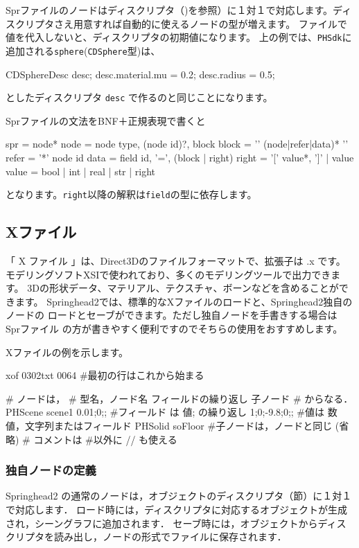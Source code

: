 Sprファイルのノードはディスクリプタ（)を参照）に１対１で対応します。ディスクリプタさえ用意すれば自動的に使えるノードの型が増えます。
\KLUDGE ファイルで値を代入しないと、ディスクリプタの初期値になります。
\KLUDGE 上の例では、\texttt{PHSdk}に追加される\texttt{sphere}(\texttt{CDSphere}型)は、
\begin{sourcecode}
CDSphereDesc desc;
desc.material.mu = 0.2;
desc.radius = 0.5;
\end{sourcecode}
\KLUDGE としたディスクリプタ \texttt{desc} で作るのと同じことになります。

Sprファイルの文法をBNF＋正規表現で書くと
\begin{sourcecode}
spr   = node*
node  = node type, (node id)?, block
block = '{' (node|refer|data)*  '}'
refer = '*' node id
data  = field id, '=', (block | right)
right = '[' value*, ']' | value
value = bool | int | real | str | right
\end{sourcecode}
\KLUDGE となります。\texttt{right}以降の解釈は\texttt{field}の型に依存します。

\subsection{Xファイル}
\KLUDGE 「 X ファイル 」は、Direct3Dのファイルフォーマットで、拡張子は .x です。
\KLUDGE モデリングソフトXSIで使われており、多くのモデリングツールで出力できます。
3Dの形状データ、マテリアル、テクスチャ、ボーンなどを含めることができます。
Springhead2では、標準的なXファイルのロードと、Springhead2独自のノードの
\KLUDGE ロードとセーブができます。ただし独自ノードを手書きする場合は Sprファイル
\KLUDGE の方が書きやすく便利ですのでそちらの使用をおすすめします。

Xファイルの例を示します。
\begin{sourcecode}
xof 0302txt 0064        #最初の行はこれから始まる

#    ノードは，
#        型名，ノード名 { フィールドの繰り返し   子ノード }
#    からなる．
PHScene scene1{
    0.01;0;;            #フィールド は 値; の繰り返し
    1;0;-9.8;0;;        #値は 数値，文字列またはフィールド
    PHSolid soFloor{    #子ノードは，ノードと同じ
        (省略)
    }
}
# コメントは #以外に // も使える
\end{sourcecode}

\subsubsection{独自ノードの定義}
Springhead2 の通常のノードは，オブジェクトのディスクリプタ（節）に１対１で対応します．
\KLUDGE ロード時には，ディスクリプタに対応するオブジェクトが生成され，シーングラフに追加されます．
\KLUDGE セーブ時には，オブジェクトからディスクリプタを読み出し，ノードの形式でファイルに保存されます．


